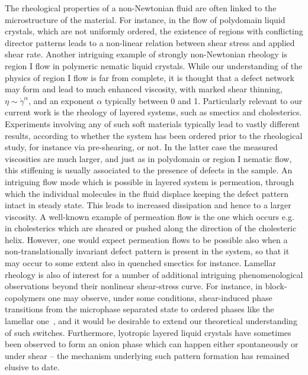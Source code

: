 \documentclass[8.5pt,twoside,twocolumn]{article}
\begin{document}
The rheological properties of a non-Newtonian fluid are often linked to the microstructure of the material. For instance, in the flow of polydomain liquid crystals, which are not uniformly ordered, the existence of regions with conflicting director patterns leads to a non-linear relation between shear stress and applied shear rate. Another intriguing example of strongly non-Newtonian rheology is region I flow in polymeric nematic liquid crystals. While our understanding of the physics of region I flow is far from complete, it is thought that a defect network may form and lead to much enhanced viscosity, with marked shear thinning, $\eta \sim \dot{\gamma}^{\alpha}$, and an exponent $\alpha$ typically between 0 and 1. Particularly relevant to our current work is the rheology of layered systems, such as smectics and cholesterics. Experiments involving any of such soft materials typically lead to vastly different results, according to whether the system has been ordered prior to the rheological study, for instance via pre-shearing, or not. In the latter case the measured viscosities are much larger, and just as in polydomain or region I nematic flow, this stiffening is usually associated to the presence of defects in the sample. An intriguing flow mode which is possible in layered system is permeation, through which the individual molecules in the fluid displace keeping the defect pattern intact in steady state. This leads to increased dissipation and hence to a larger viscosity. A well-known example of permeation flow is the one which occurs e.g. in cholesterics which are sheared or pushed along the direction of the cholesteric helix. However, one would expect permeation flows to be possible also when a non-translationally invariant defect pattern is present in the system, so that it may occur to some extent also in quenched smectics for instance.
Lamellar rheology is also of interest for a number of additional intriguing phenomenological observations beyond their nonlinear shear-stress curve. For instance, in block-copolymers one may observe, under some conditions, shear-induced phase transitions from the microphase separated state to ordered phases like the lamellar one~\cite{Cates89,Koppi93,Fredrickson94}, and it would be desirable to extend our theoretical understanding of such switches. Furthermore, lyotropic layered liquid crystals have sometimes been observed to form an onion phase \cite{Panizza96,Iwashita07} which can happen either spontaneously \cite{Gomati87,Boltenhagen92,Fournier94,Ramos04} or under shear \cite{Diat93} -- the mechanism underlying such pattern formation has remained elusive to date. 
\end{document}
